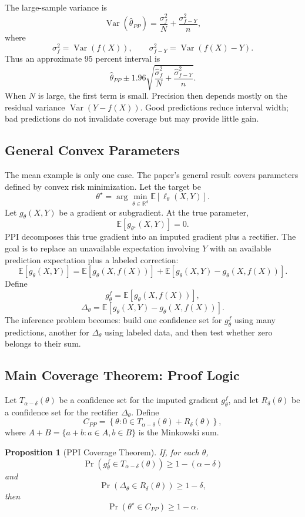 \documentclass[11pt]{article}
\newtheorem{proposition}{Proposition}
\newcommand{\E}{\mathbb{E}}
\newcommand{\Var}{\operatorname{Var}}
\newcommand{\R}{\mathbb{R}}
\begin{document}
The large-sample variance is
\[
  \Var(\widehat\theta_{PP})
  =
  \frac{\sigma_f^2}{N}
  +
  \frac{\sigma_{f-Y}^2}{n},
\]
where
\[
  \sigma_f^2=\Var(f(X)),
  \qquad
  \sigma_{f-Y}^2=\Var(f(X)-Y).
\]
Thus an approximate 95 percent interval is
\[
  \widehat\theta_{PP}
  \pm
  1.96
  \sqrt{
    \frac{\widehat\sigma_f^2}{N}
    +
    \frac{\widehat\sigma_{f-Y}^2}{n}
  }.
\]
When $N$ is large, the first term is small. Precision then depends mostly on the residual variance $\Var(Y-f(X))$. Good predictions reduce interval width; bad predictions do not invalidate coverage but may provide little gain.

\subsection{General Convex Parameters}

The mean example is only one case. The paper's general result covers parameters defined by convex risk minimization. Let the target be
\[
  \theta^\star
  =
  \arg\min_{\theta\in\R^d}
  \E[\ell_\theta(X,Y)].
\]
Let $g_\theta(X,Y)$ be a gradient or subgradient. At the true parameter,
\[
  \E[g_{\theta^\star}(X,Y)]=0.
\]
PPI decomposes this true gradient into an imputed gradient plus a rectifier. The goal is to replace an unavailable expectation involving $Y$ with an available prediction expectation plus a labeled correction:
\[
  \E[g_\theta(X,Y)]
  =
  \E[g_\theta(X,f(X))]
  +
  \E[g_\theta(X,Y)-g_\theta(X,f(X))].
\]
Define
\[
  g_\theta^f=\E[g_\theta(X,f(X))],
\]
\[
  \Delta_\theta=\E[g_\theta(X,Y)-g_\theta(X,f(X))].
\]
The inference problem becomes: build one confidence set for $g_\theta^f$ using many predictions, another for $\Delta_\theta$ using labeled data, and then test whether zero belongs to their sum.

\subsection{Main Coverage Theorem: Proof Logic}

Let $T_{\alpha-\delta}(\theta)$ be a confidence set for the imputed gradient $g_\theta^f$, and let $R_\delta(\theta)$ be a confidence set for the rectifier $\Delta_\theta$. Define
\[
  C_{PP}
  =
  \left\{
    \theta:
    0\in T_{\alpha-\delta}(\theta)+R_\delta(\theta)
  \right\},
\]
where $A+B=\{a+b:a\in A,b\in B\}$ is the Minkowski sum.

\begin{proposition}[PPI Coverage Theorem]
If, for each $\theta$,
\[
  \Pr(g_\theta^f\in T_{\alpha-\delta}(\theta))\ge 1-(\alpha-\delta)
\]
and
\[
  \Pr(\Delta_\theta\in R_\delta(\theta))\ge 1-\delta,
\]
then
\[
  \Pr(\theta^\star\in C_{PP})\ge 1-\alpha.
\]
\end{proposition}
\end{document}
